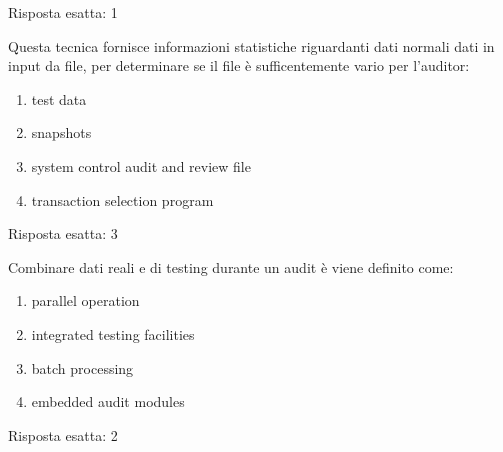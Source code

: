 \begin{Answer} [
  ref={esCs4},
  number={4}
  ]

  \Question Risposta esatta: 1
\end{Answer}


\begin{Exercise} [
  title={Quiz},
  label={esCs5}
  ]

  \Question Questa tecnica fornisce informazioni statistiche riguardanti dati
normali dati in input da file, per determinare se il file \`e sufficentemente
vario per l'auditor:
\begin{enumerate}
\item test data
\item snapshots
\item system control audit and review file
\item transaction selection program
\end{enumerate}

\end{Exercise}

\begin{Answer} [
  ref={esCs5},
  number={5}
  ]

  \Question Risposta esatta: 3
\end{Answer}


\begin{Exercise} [
  title={Quiz},
  label={esCs6}
  ]

  \Question Combinare dati reali e di testing durante un audit \`e viene
definito come:
\begin{enumerate}
\item parallel operation
\item integrated testing facilities
\item batch processing
\item embedded audit modules
\end{enumerate}

\end{Exercise}

\begin{Answer} [
  ref={esCs6},
  number={6}
  ]

  \Question Risposta esatta: 2
\end{Answer}


